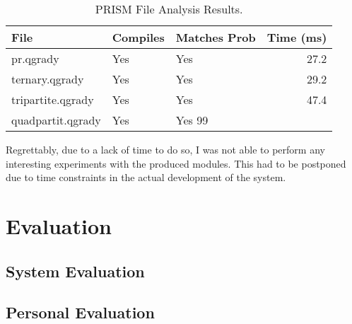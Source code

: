 \documentclass[report.tex]{subfiles}
\begin{document}
\begin{table}[H]
  \centering
  \begin{tabular}{l | l | l | r}
    File & Compiles & Matches Prob & Time (ms)\\
    \hline
    pr.qgrady & Yes & Yes & 27.2 \\
    ternary.qgrady & Yes & Yes & 29.2 \\
    tripartite.qgrady & Yes & Yes & 47.4 \\
    quadpartit.qgrady & Yes & Yes 99 &
  \end{tabular}
  \caption{PRISM File Analysis Results.}
  \label{tab:prism_result}
\end{table}

Regrettably, due to a lack of time to do so, I was not able to perform any
interesting experiments with the produced modules. This had to be postponed
due to time constraints in the actual development of the system.

\section{Evaluation} %
\label{sec:evaluation}
\subsection{System Evaluation} %
\label{sub:system_evaluation}


\subsection{Personal Evaluation} %
\label{sub:personal_evaluation}


\newpage
\end{document}
